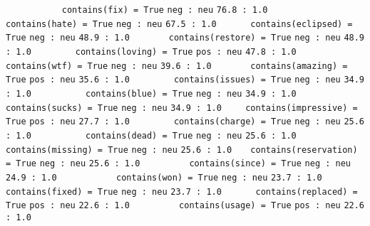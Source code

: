 \verb'           contains(fix) = True'	\verb'neg : neu'	\verb'76.8 : 1.0'
\verb'          contains(hate) = True'	\verb'neg : neu'	\verb'67.5 : 1.0'
\verb'      contains(eclipsed) = True'	\verb'neg : neu'	\verb'48.9 : 1.0'
\verb'       contains(restore) = True'	\verb'neg : neu'	\verb'48.9 : 1.0'
\verb'        contains(loving) = True'	\verb'pos : neu'	\verb'47.8 : 1.0'
\verb'           contains(wtf) = True'	\verb'neg : neu'	\verb'39.6 : 1.0'
\verb'       contains(amazing) = True'	\verb'pos : neu'	\verb'35.6 : 1.0'
\verb'        contains(issues) = True'	\verb'neg : neu'	\verb'34.9 : 1.0'
\verb'          contains(blue) = True'	\verb'neg : neu'	\verb'34.9 : 1.0'
\verb'         contains(sucks) = True'	\verb'neg : neu'	\verb'34.9 : 1.0'
\verb'    contains(impressive) = True'	\verb'pos : neu'	\verb'27.7 : 1.0'
\verb'        contains(charge) = True'	\verb'neg : neu'	\verb'25.6 : 1.0'
\verb'          contains(dead) = True'	\verb'neg : neu'	\verb'25.6 : 1.0'
\verb'       contains(missing) = True'	\verb'neg : neu'	\verb'25.6 : 1.0'
\verb'   contains(reservation) = True'	\verb'neg : neu'	\verb'25.6 : 1.0'
\verb'         contains(since) = True'	\verb'neg : neu'	\verb'24.9 : 1.0'
\verb'           contains(won) = True'	\verb'neg : neu'	\verb'23.7 : 1.0'
\verb'         contains(fixed) = True'	\verb'neg : neu'	\verb'23.7 : 1.0'
\verb'      contains(replaced) = True'	\verb'pos : neu'	\verb'22.6 : 1.0'
\verb'         contains(usage) = True'	\verb'pos : neu'	\verb'22.6 : 1.0'


